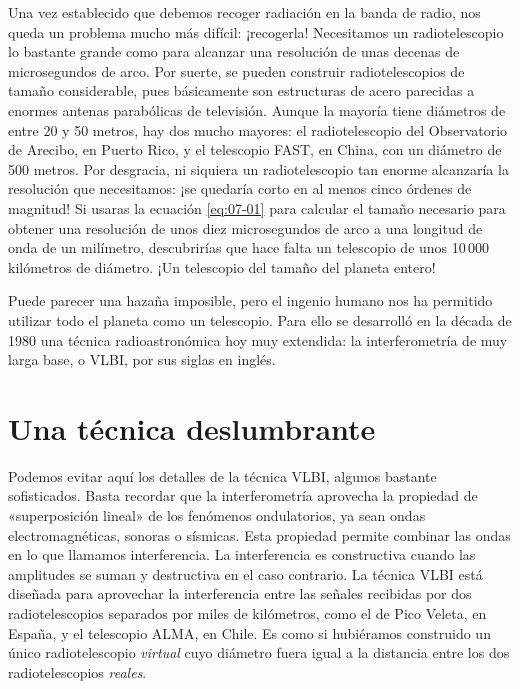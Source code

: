 Una vez establecido que debemos recoger radiación en la banda de radio, nos queda un problema mucho más difícil: ¡recogerla! Necesitamos un radiotelescopio lo bastante grande como para alcanzar una resolución de unas decenas de microsegundos de arco. Por suerte, se pueden construir radiotelescopios de tamaño considerable, pues básicamente son estructuras de acero parecidas a enormes antenas parabólicas de televisión. Aunque la mayoría tiene diámetros de entre 20 y 50 metros, hay dos mucho mayores: el radiotelescopio del Observatorio de Arecibo, en Puerto Rico, y el telescopio FAST, en China, con un diámetro de 500 metros. Por desgracia, ni siquiera un radiotelescopio tan enorme alcanzaría la resolución que necesitamos: ¡se quedaría corto en al menos cinco órdenes de magnitud! Si usaras la ecuación \eqref{eq:07-01} para calcular el tamaño necesario para obtener una resolución de unos diez microsegundos de arco a una longitud de onda de un milímetro, descubrirías que hace falta un telescopio de unos 10\,000 kilómetros de diámetro. ¡Un telescopio del tamaño del planeta entero!

Puede parecer una hazaña imposible, pero el ingenio humano nos ha permitido utilizar todo el planeta como un telescopio. Para ello se desarrolló en la década de 1980 una técnica radioastronómica hoy muy extendida: la interferometría de muy larga base, o VLBI, por sus siglas en inglés.

\section{Una técnica deslumbrante}\label{sec:07-vlbi}

Podemos evitar aquí los detalles de la técnica VLBI, algunos bastante sofisticados. Basta recordar que la interferometría aprovecha la propiedad de «superposición lineal» de los fenómenos ondulatorios, ya sean ondas electromagnéticas, sonoras o sísmicas. Esta propiedad permite combinar las ondas en lo que llamamos interferencia. La interferencia es constructiva cuando las amplitudes se suman y destructiva en el caso contrario. La técnica VLBI está diseñada para aprovechar la interferencia entre las señales recibidas por dos radiotelescopios separados por miles de kilómetros, como el de Pico Veleta, en España, y el telescopio ALMA, en Chile. Es como si hubiéramos construido un único radiotelescopio \emph{virtual} cuyo diámetro fuera igual a la distancia entre los dos radiotelescopios \emph{reales}.

